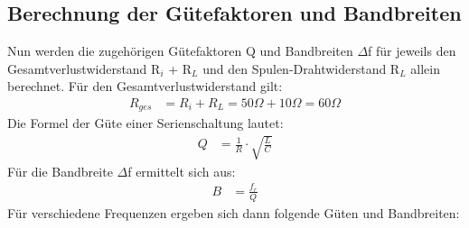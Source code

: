 \documentclass{article}
\begin{document}
\subsection{Berechnung der Gütefaktoren und Bandbreiten}
Nun werden die zugehörigen Gütefaktoren Q und Bandbreiten $\Delta$f für jeweils den Gesamtverlustwiderstand R$_i$ + R$_L$ und den Spulen-Drahtwiderstand R$_L$ allein berechnet.
Für den Gesamtverlustwiderstand gilt:
\begin{align*}
  R_{ges} & = R_i + R_L= 50\Omega + 10\Omega = 60\Omega
\end{align*}
Die Formel der Güte einer Serienschaltung lautet:
\begin{align*}
  Q & = \frac{1}{R}\cdot\sqrt{\frac{L}{C}}
\end{align*}
Für die Bandbreite $\Delta$f ermittelt sich aus:
\begin{align*}
  B & = \frac{f_r}{Q}
\end{align*}
Für verschiedene Frequenzen ergeben sich dann folgende Güten und Bandbreiten:
\end{document}
